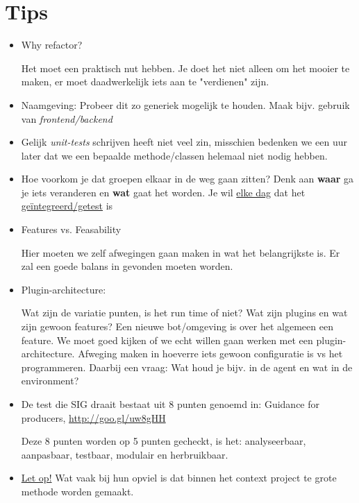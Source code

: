 \documentclass{article}
\begin{document}
\section{Tips}
\begin{itemize}
\item Why refactor? 

Het moet een praktisch nut hebben. Je doet het niet alleen om het mooier te maken, er moet daadwerkelijk iets aan te "verdienen" zijn. 
\item Naamgeving: Probeer dit zo generiek mogelijk te houden. Maak bijv. gebruik van \emph{frontend/backend}
\item Gelijk \emph{unit-tests} schrijven heeft niet veel zin, misschien bedenken we een uur later dat we een bepaalde methode/classen helemaal niet nodig hebben. 
\item Hoe voorkom je dat groepen elkaar in de weg gaan zitten? 
Denk aan \textbf{waar} ga je iets veranderen en \textbf{wat} gaat het worden. Je wil \underline{elke dag} dat het \underline{geïntegreerd/getest} is
\item Features vs. Feasability

Hier moeten we zelf afwegingen gaan maken in wat het belangrijkste is. Er zal een goede balans in gevonden moeten worden. 

\item Plugin-architecture:

Wat zijn de variatie punten, is het run time of niet? Wat zijn plugins en wat zijn gewoon features? Een nieuwe bot/omgeving is over het algemeen een feature. We moet goed kijken of we echt willen gaan werken met een plugin-architecture. Afweging maken in hoeverre iets gewoon configuratie is vs het programmeren. Daarbij een vraag: Wat houd je bijv. in de agent en wat in de environment? 

\item De test die SIG draait bestaat uit 8 punten genoemd in: Guidance for producers, \url{http://goo.gl/uw8gHH} 

Deze 8 punten worden op 5 punten gecheckt, is het: analyseerbaar, aanpasbaar, testbaar, modulair en herbruikbaar. 

\item \underline{Let op!} Wat vaak bij hun opviel is dat binnen het context project te grote methode worden gemaakt. 
\end{itemize}
\end{document}
